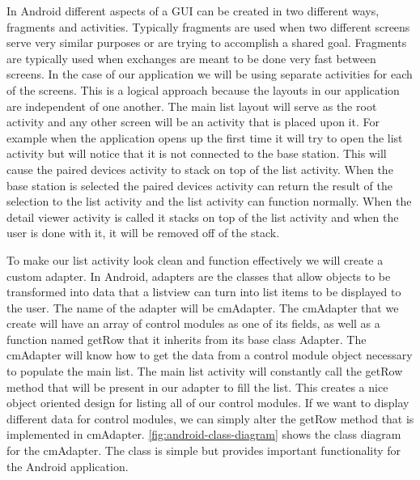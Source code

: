 In Android different aspects of a GUI can be created in two different ways,
fragments and activities. Typically fragments are used when two different
screens serve very similar purposes or are trying to accomplish a shared goal.
Fragments are typically used when exchanges are meant to be done very fast
between screens. In the case of our application we will be using separate
activities for each of the screens. This is a logical approach because the
layouts in our application are independent of one another. The main list layout
will serve as the root activity and any other screen will be an activity that
is placed upon it. For example when the application opens up the first time it
will try to open the list activity but will notice that it is not connected to
the base station. This will cause the paired devices activity to stack on top
of the list activity. When the base station is selected the paired devices
activity can return the result of the selection to the list activity and the
list activity can function normally. When the detail viewer activity is called
it stacks on top of the list activity and when the user is done with it, it
will be removed off of the stack.

To make our list activity look clean and function effectively we will create a
custom adapter. In Android, adapters are the classes that allow objects to be
transformed into data that a listview can turn into list items to be displayed
to the user. The name of the adapter will be cmAdapter. The cmAdapter that we
create will have an array of control modules as one of its fields, as well as a
function named getRow that it inherits from its base class Adapter. The
cmAdapter will know how to get the data from a control module object necessary
to populate the main list. The main list activity will constantly call the
getRow method that will be present in our adapter to fill the list. This
creates a nice object oriented design for listing all of our control modules.
If we want to display different data for control modules, we can simply alter
the getRow method that is implemented in cmAdapter.
\autoref{fig:android-class-diagram} shows the class diagram for the cmAdapter.
The class is simple but provides important functionality for the Android
application.



